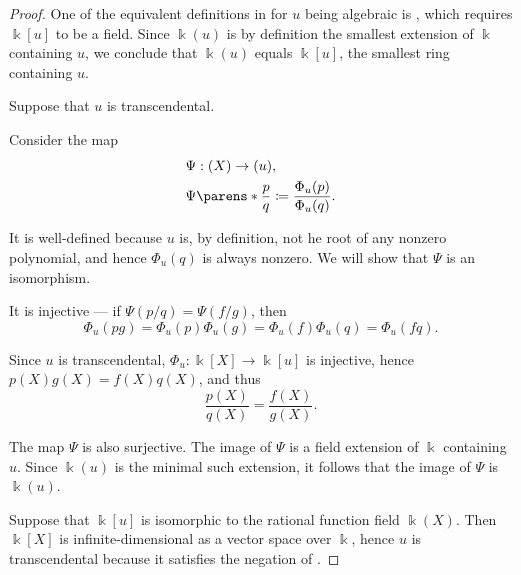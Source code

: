 \begin{proof}
   One of the equivalent definitions in  for \( u \) being algebraic is , which requires \( \Bbbk[u] \) to be a field. Since \( \Bbbk(u) \) is by definition the smallest extension of \( \Bbbk \) containing \( u \), we conclude that \( \Bbbk(u) \) equals \( \Bbbk[u] \), the smallest ring containing \( u \).


  \SufficiencySubProof* Suppose that \( u \) is transcendental.

  Consider the map
  \begin{equation*}
    \begin{aligned}
      &\Psi: \Bbbk(X) \to \Bbbk(u), \\
      &\Psi\parens*{ \frac p q } \coloneqq \frac {\Phi_u(p)} {\Phi_u(q)}.
    \end{aligned}
  \end{equation*}

  It is well-defined because \( u \) is, by definition, not he root of any nonzero polynomial, and hence \( \Phi_u(q) \) is always nonzero. We will show that \( \Psi \) is an isomorphism.

  It is injective --- if \( \Psi(p / q) = \Psi(f / g) \), then
  \begin{equation*}
    \Phi_u(pg) = \Phi_u(p) \Phi_u(g) = \Phi_u(f) \Phi_u(q) = \Phi_u(fq).
  \end{equation*}

  Since \( u \) is transcendental, \( \Phi_u: \Bbbk[X] \to \Bbbk[u] \) is injective, hence \( p(X) g(X) = f(X) q(X) \), and thus
  \begin{equation*}
    \frac {p(X)} {q(X)} = \frac {f(X)} {g(X)}.
  \end{equation*}

  The map \( \Psi \) is also surjective. The image of \( \Psi \) is a field extension of \( \Bbbk \) containing \( u \). Since \( \Bbbk(u) \) is the minimal such extension, it follows that the image of \( \Psi \) is \( \Bbbk(u) \).

  \NecessitySubProof* Suppose that \( \Bbbk[u] \) is isomorphic to the rational function field \( \Bbbk(X) \). Then \( \Bbbk[X] \) is infinite-dimensional as a vector space over \( \Bbbk \), hence \( u \) is transcendental because it satisfies the negation of .
\end{proof}

